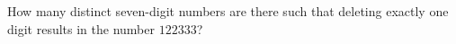 How many distinct seven-digit numbers are there such that deleting exactly one digit results in the number $122333$?
